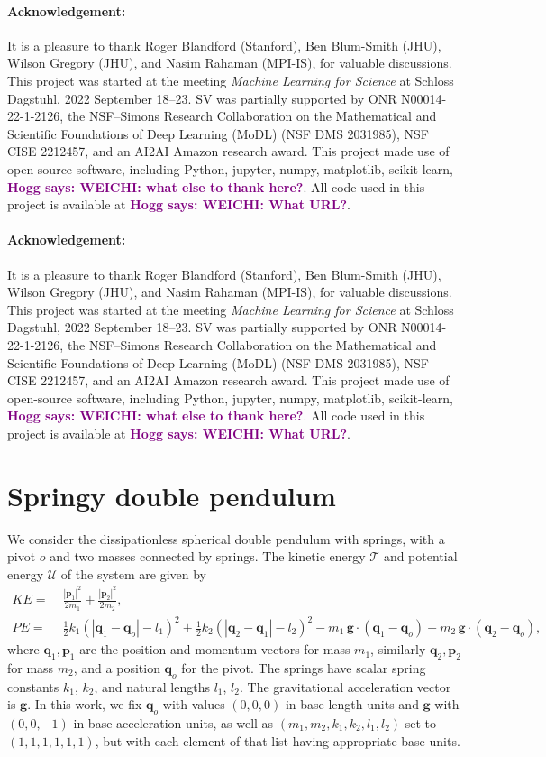 \documentclass[preprint]{article} %
\renewcommand{\mathcal}[1]{\mathscr{#1}} %
\newcommand{\hogg}[1]{\textcolor{purple}{\textbf{Hogg says: #1}}}
\begin{document}
\newcommand{\ack}{\paragraph{Acknowledgement:}
It is a pleasure to thank
   Roger Blandford (Stanford),
   Ben Blum-Smith (JHU),
   Wilson Gregory (JHU),
   and
   Nasim Rahaman (MPI-IS),
for valuable discussions.
This project was started at the meeting \textit{Machine Learning for Science} at Schloss Dagstuhl, 2022 September 18--23.
SV was partially supported by
   ONR N00014-22-1-2126, 
   the NSF–Simons Research Collaboration on the Mathematical and Scientific Foundations of Deep Learning (MoDL) (NSF DMS 2031985),
   NSF CISE 2212457,
   and
   an AI2AI Amazon research award.
This project made use of open-source software, including Python, jupyter, numpy, matplotlib, scikit-learn, \hogg{WEICHI: what else to thank here?}.
All code used in this project is available at \hogg{WEICHI: What URL?}.
}

\makeatletter
\if@preprint
  \ack
\else
  \if@accepted
    \ack
  \fi
\fi
\makeatother

{\raggedright


}

\appendix
\section{Springy double pendulum}\label{app:pendulum}
We consider the dissipationless spherical double pendulum with springs, with a pivot $o$ and two masses connected by springs. The kinetic energy $\mathcal{T}$ and potential energy $\mathcal{U}$ of the system are given by
\begin{align}
    KE =&\;\frac{|\mathbf{p}_1|^2}{2m_1} +\frac{|\mathbf{p}_2|^2}{2m_2}, \label{eq:energy_T}\\
    PE =&\;\frac12 k_1(|\mathbf{q}_1-\mathbf{q}_o|-l_1)^2 + \frac12 k_2(|\mathbf{q}_2-\mathbf{q}_1|-l_2)^2 
    -m_1\,\mathbf{g}\cdot (\mathbf{q}_1-\mathbf{q}_o)- m_2 \,\mathbf{g}\cdot  (\mathbf{q}_2-\mathbf{q}_o), \label{eq:energy_U}
\end{align}
where $\mathbf{q}_1, \mathbf{p}_1$ are the position and momentum vectors for mass $m_1$, similarly $\mathbf{q}_2, \mathbf{p}_2$ for mass $m_2$, and a position $\mathbf{q}_o$ for the pivot. The springs have scalar spring constants $k_1$, $k_2$, and natural lengths $l_1$, $l_2$. The gravitational acceleration vector is $\mathbf{g}$. 
In this work, we fix $\mathbf{q}_o$ with values $(0,0,0)$ in base length units and $\mathbf{g}$ with $(0,0,-1)$ in base acceleration units, as well as $(m_1, m_2, k_1, k_2, l_1, l_2)$ set to $(1,1,1,1,1,1)$, but with each element of that list having appropriate base units. 
\end{document}
